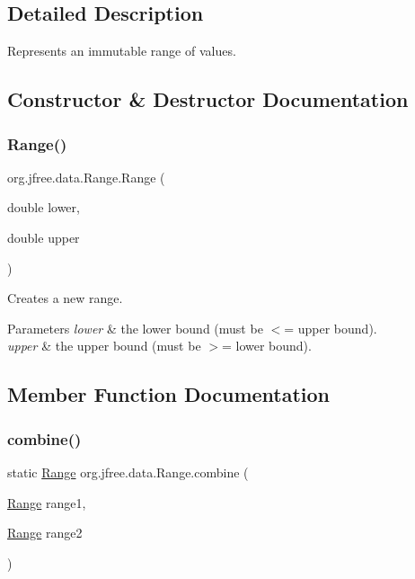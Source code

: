 \subsection{Detailed Description}
Represents an immutable range of values. 

\subsection{Constructor \& Destructor Documentation}
\mbox{\label{classorg_1_1jfree_1_1data_1_1_range_a4c6d51dd50e9a0c0ac2f675776095ef7}} 
\subsubsection{\texorpdfstring{Range()}{Range()}}
{\footnotesize\ttfamily org.\+jfree.\+data.\+Range.\+Range (\begin{DoxyParamCaption}\item[{double}]{lower,  }\item[{double}]{upper }\end{DoxyParamCaption})}

Creates a new range.


\begin{DoxyParams}{Parameters}
{\em lower} & the lower bound (must be $<$= upper bound). \\
\hline
{\em upper} & the upper bound (must be $>$= lower bound). \\
\hline
\end{DoxyParams}


\subsection{Member Function Documentation}
\mbox{\label{classorg_1_1jfree_1_1data_1_1_range_a885e176d7890aaf750c9aed1ea7cc41f}} 
\subsubsection{\texorpdfstring{combine()}{combine()}}
{\footnotesize\ttfamily static \mbox{\hyperlink{classorg_1_1jfree_1_1data_1_1_range}{Range}} org.\+jfree.\+data.\+Range.\+combine (\begin{DoxyParamCaption}\item[{\mbox{\hyperlink{classorg_1_1jfree_1_1data_1_1_range}{Range}}}]{range1,  }\item[{\mbox{\hyperlink{classorg_1_1jfree_1_1data_1_1_range}{Range}}}]{range2 }\end{DoxyParamCaption})\hspace{0.3cm}{\ttfamily [static]}}

